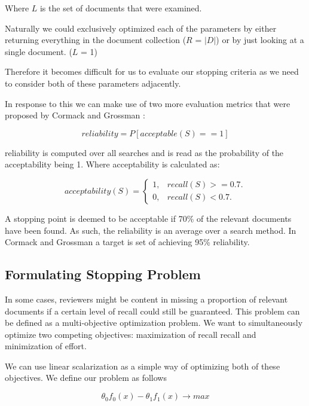 Where $L$ is the set of documents that were examined.

Naturally we could exclusively optimized each of the parameters by either returning everything in the document collection ($R$ = $|D|$) or by just looking at a single document. ($L$ = 1)

Therefore it becomes difficult for us to evaluate our stopping criteria as we need to consider both of these parameters adjacently.

In response to this we can make use of two more evaluation metrics that were proposed by Cormack and Grossman \cite{Cormack2016}:

\begin{equation}
reliability = P [acceptable(S) == 1]
\end{equation}

reliability is computed over all searches and is read as the probability of the acceptability being 1. Where acceptability is calculated as:

\begin{equation}
  acceptability(S)=\begin{cases}
    1, & \text{$recall(S)>=0.7$}.\\
    0, & \text{$recall(S)<0.7$}.
  \end{cases}
\end{equation}

A stopping point is deemed to be acceptable if 70\% of the relevant documents have been found. As such, the reliability is an average over a search method. In Cormack and Grossman \cite{Cormack2016} a target is set of achieving 95\% reliability.


\subsection{Formulating Stopping Problem} \label{stoppingProblem}

In some cases, reviewers might be content in missing a proportion of relevant documents if a certain level of recall could still be guaranteed. This problem can be defined as a multi-objective optimization problem. We want to simultaneously optimize two competing objectives: maximization of recall recall and minimization of effort. 

We can use linear scalarization \cite{Noghin2015} as a simple way of optimizing both of these objectives. We define our problem as follows

\begin{equation}
\theta_{0} f_0(x) -\theta_{1} f_1(x) \rightarrow max
\end{equation}

